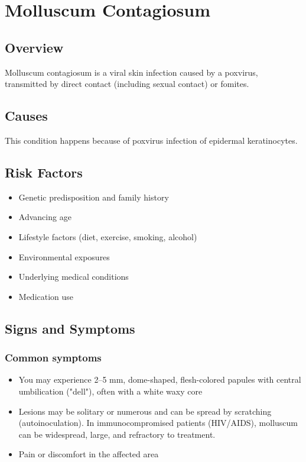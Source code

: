 \chapter{Molluscum Contagiosum}
\label{sec:Molluscum Contagiosum}

\section{Overview}
Molluscum contagiosum is a viral skin infection caused by a poxvirus, transmitted by direct contact (including sexual contact) or fomites.
\section{Causes}
This condition happens because of poxvirus infection of epidermal keratinocytes.     
\section{Risk Factors}

\begin{itemize}[noitemsep]
  \item Genetic predisposition and family history
  \item Advancing age
  \item Lifestyle factors (diet, exercise, smoking, alcohol)
  \item Environmental exposures
  \item Underlying medical conditions
  \item Medication use
\end{itemize}
\section{Signs and Symptoms}

\subsection{Common symptoms}
\begin{itemize}[noitemsep]
  \item You may experience 2--5 mm, dome-shaped, flesh-colored papules with central umbilication ("dell"), often with a white waxy core
  \item Lesions may be solitary or numerous and can be spread by scratching (autoinoculation). In immunocompromised patients (HIV/AIDS), molluscum can be widespread, large, and refractory to treatment.
  \item Pain or discomfort in the affected area
  \end{itemize}

